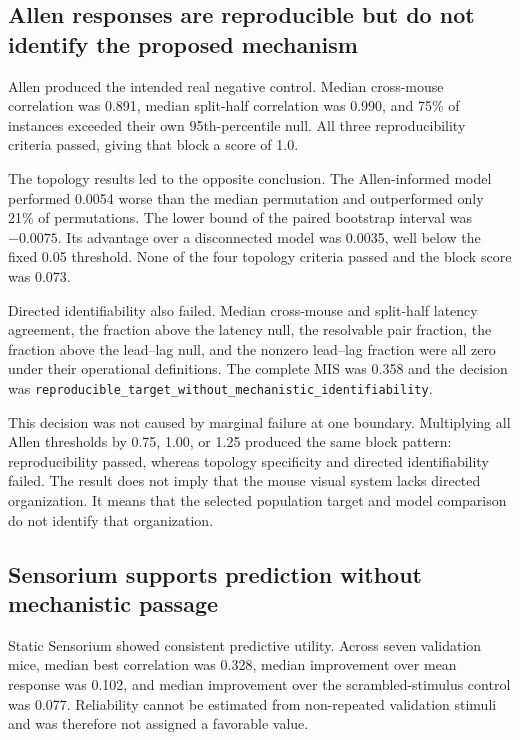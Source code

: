 \subsection{Allen responses are reproducible but do not identify the proposed
mechanism}
\label{subsec:results-allen}

Allen produced the intended real negative control. Median cross-mouse
correlation was 0.891, median split-half correlation was 0.990, and 75\% of
instances exceeded their own 95th-percentile null. All three reproducibility
criteria passed, giving that block a score of 1.0.

The topology results led to the opposite conclusion. The Allen-informed model
performed 0.0054 worse than the median permutation and outperformed only 21\%
of permutations. The lower bound of the paired bootstrap interval was
$-0.0075$. Its advantage over a disconnected model was 0.0035, well below the
fixed 0.05 threshold. None of the four topology criteria passed and the block
score was 0.073.

Directed identifiability also failed. Median cross-mouse and split-half latency
agreement, the fraction above the latency null, the resolvable pair fraction,
the fraction above the lead--lag null, and the nonzero lead--lag fraction were
all zero under their operational definitions. The complete MIS was 0.358 and
the decision was
\texttt{reproducible\_target\_without\_mechanistic\_identifiability}.

This decision was not caused by marginal failure at one boundary. Multiplying
all Allen thresholds by 0.75, 1.00, or 1.25 produced the same block pattern:
reproducibility passed, whereas topology specificity and directed
identifiability failed. The result does not imply that the mouse visual system
lacks directed organization. It means that the selected population target and
model comparison do not identify that organization.

\subsection{Sensorium supports prediction without mechanistic passage}
\label{subsec:results-sensorium}

Static Sensorium showed consistent predictive utility. Across seven validation
mice, median best correlation was 0.328, median improvement over mean response
was 0.102, and median improvement over the scrambled-stimulus control was
0.077. Reliability cannot be estimated from non-repeated validation stimuli and
was therefore not assigned a favorable value.

